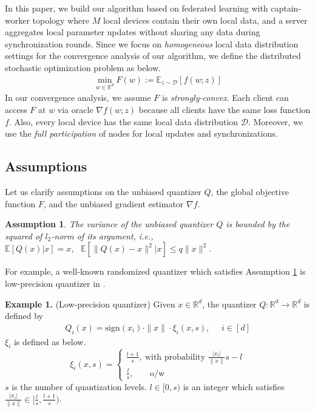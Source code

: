 \documentclass[11pt]{article}
\newtheorem{assumption}[theorem]{Assumption}
\begin{document}
In this paper, we build our algorithm based on federated learning with captain-worker topology where $M$ local devices contain their own local data, and a server aggregates local parameter updates without sharing any data during synchronization rounds. Since we focus on \emph{homogeneous} local data distribution settings for the convergence analysis of our algorithm, we define the distributed stochastic optimization problem as below.
\begin{align*}
    \min_{w \in \mathbb{R}^d} F(w) := \mathbb{E}_{z\sim\mathcal{D}}[f(w;z)]
\end{align*}
In our convergence analysis, we assume $F$ is \emph{strongly-convex}. Each client can access $F$ at $w$ via oracle $\nabla f(w;z)$ because all clients have the same loss function $f$. Also, every local device has the same local data distribution $\mathcal{D}$. Moreover, we use the \emph{full participation} of nodes for local updates and synchronizations.

\subsection{Assumptions}

Let us clarify assumptions on the unbiased quantizer $Q$, the global objective function $F$, and the unbiased gradient estimator $\nabla f$.

\begin{assumption} \label{assumption1}
The variance of the unbiased quantizer $Q$ is bounded by the squared of $l_2$-norm of its argument, i.e., $\mathbb{E}[Q(x)|x]=x, \textrm{ } \mathbb{E}[\|Q(x) - x\|^2 |x] \leq q \|x\|^2$.
\end{assumption}
For example, a well-known randomized quantizer which satisfies Assumption \ref{assumption1} is low-precision quantizer in \cite{Yeojoon-alistarh2017qsgd}.

\textbf{Example 1.} (Low-precision quantizer) Given $x \in \mathbb{R}^d$, the quantizer $Q:\mathbb{R}^d \rightarrow \mathbb{R}^d$ is defined by
\begin{align*}
    Q_i(x) = \textrm{sign}(x_i)\cdot\|x\|\cdot \xi_i(x, s),   \textrm{ } \textrm{ } i \in [d]
\end{align*}
$\xi_i$ is defined as below.
$$\xi_i(x, s)=
\begin{cases}
\frac{l+1}{s},~\textrm{with probability } \frac{|x_i|}{\|x\|}s - l\\
\frac{l}{s},~\textrm{ } \textrm{ } \textrm{ o/w}
\end{cases}$$
$s$ is the number of quantization levels. $l \in [0, s)$ is an integer which satisfies $\frac{|x_i|}{\|x\|} \in [\frac{l}{s}, \frac{l+1}{s})$.
\end{document}
